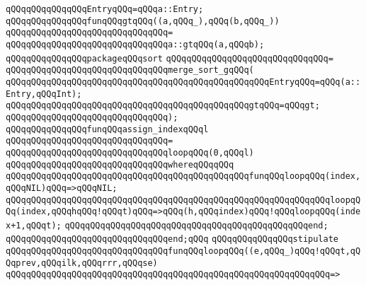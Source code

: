 \newline
\verb|qQQqqQQqqQQqqQQqEntryqQQq=qQQqa::Entry;|\newline
\newline
\verb|qQQqqQQqqQQqqQQqfunqQQqgtqQQq((a,qQQq_),qQQq(b,qQQq_))|\newline
\verb|qQQqqQQqqQQqqQQqqQQqqQQqqQQqqQQq=|\newline
\verb|qQQqqQQqqQQqqQQqqQQqqQQqqQQqqQQqa::gtqQQq(a,qQQqb);|\newline
\newline
\verb|qQQqqQQqqQQqqQQqpackageqQQqsort|\newline
\verb|qQQqqQQqqQQqqQQqqQQqqQQqqQQqqQQq=|\newline
\verb|qQQqqQQqqQQqqQQqqQQqqQQqqQQqqQQqmerge_sort_gqQQq(|\newline
\verb|qQQqqQQqqQQqqQQqqQQqqQQqqQQqqQQqqQQqqQQqqQQqqQQqqQQqEntryqQQq=qQQq(a::Entry,qQQqInt);|\newline
\verb|qQQqqQQqqQQqqQQqqQQqqQQqqQQqqQQqqQQqqQQqqQQqqQQqgtqQQq=qQQqgt;|\newline
\verb|qQQqqQQqqQQqqQQqqQQqqQQqqQQqqQQq);|\newline
\newline
\verb|qQQqqQQqqQQqqQQqfunqQQqassign_indexqQQql|\newline
\verb|qQQqqQQqqQQqqQQqqQQqqQQqqQQqqQQq=|\newline
\verb|qQQqqQQqqQQqqQQqqQQqqQQqqQQqqQQqloopqQQq(0,qQQql)|\newline
\verb|qQQqqQQqqQQqqQQqqQQqqQQqqQQqqQQqwhereqQQqqQQq|\newline
\newline
\verb|qQQqqQQqqQQqqQQqqQQqqQQqqQQqqQQqqQQqqQQqqQQqqQQqfunqQQqloopqQQq(index,qQQqNIL)qQQq=>qQQqNIL;|\newline
\verb|qQQqqQQqqQQqqQQqqQQqqQQqqQQqqQQqqQQqqQQqqQQqqQQqqQQqqQQqqQQqqQQqloopqQQq(index,qQQqhqQQq!qQQqt)qQQq=>qQQq(h,qQQqindex)qQQq!qQQqloopqQQq(index+1,qQQqt);|\newline
\verb|qQQqqQQqqQQqqQQqqQQqqQQqqQQqqQQqqQQqqQQqqQQqqQQqend;|\newline
\verb|qQQqqQQqqQQqqQQqqQQqqQQqqQQqqQQqend;qQQq|\newline
\newline
\verb|qQQqqQQqqQQqqQQqstipulate|\newline
\verb|qQQqqQQqqQQqqQQqqQQqqQQqqQQqqQQqfunqQQqloopqQQq((e,qQQq_)qQQq!qQQqt,qQQqprev,qQQqilk,qQQqrrr,qQQqse)|\newline
\verb|qQQqqQQqqQQqqQQqqQQqqQQqqQQqqQQqqQQqqQQqqQQqqQQqqQQqqQQqqQQqqQQq=>|\newline
